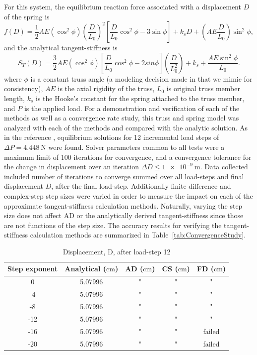 \documentclass[preprint,12pt]{elsarticle}
\begin{document}
%
For this system, the equilibrium reaction force associated with a displacement $D$ of the spring is 
%
\begin{equation} 
    \label{eqn:TrussForce}
    f(D) = \frac 1 2 AE(\cos^{2}\phi)\left(\frac{D}{L_{0}}\right)^{2}\left[\frac{D}{L_{0}}\cos^{2}\phi - 3\sin\phi\right] + k_{s}D + \left(AE\frac{D}{L_{0}}\right)\sin^{2}\phi,
\end{equation} 
%
and the analytical tangent-stiffness is 
%
\begin{equation} 
    \label{eqn:TrussStiffness}
    S_{T}(D) = \frac 3 2 AE(\cos^{2}\phi)\left[\frac{D}{L_{0}}\cos^{2}\phi - 2sin\phi\right]\left(\frac{D}{L_{0}^{2}}\right) + k_{s} + \frac{AE\sin^{2}\phi}{L_{0}}.
\end{equation}
%
where $\phi$ is a constant truss angle (a modeling decision made in \cite{rezaiee2010dynamic} that we mimic for consistency), $AE$ is the axial rigidity of the truss, $L_{0}$ is original truss member length, $k_{s}$ is the Hooke's constant for the spring attached to the truss member, and $P$ is the applied load. For a demonstration and verification of each of the methods as well as a convergence rate study, this truss and spring model was analyzed with each of the methods and compared with the analytic solution. As in the reference \cite{rezaiee2010dynamic}, equilibrium solutions for 12 incremental load steps of $\Delta P=\SI{4.448}{\newton}$ were found. Solver parameters common to all tests were a maximum limit of 100 iterations for convergence, and a convergence tolerance for the change in displacement over an iteration $\Delta D \le \SI{1e-9}{\meter}$.  Data collected included number of iterations to converge summed over all load-steps and final displacement $D$, after the final load-step. Additionally finite difference and complex-step step sizes were varied in order to measure the impact on each of the approximate tangent-stiffness calculation methods. Naturally, varying the step size does not affect AD or the analytically derived tangent-stiffness since those are not functions of the step size. The accuracy results for verifying the tangent-stiffness calculation methods are summarized in Table~\ref{tab:ConvergenceStudy}. 
%
\begin{table}[tbp]    
  \centering
  \caption{Displacement, D, after load-step 12} \label{tab:Verification}   
        \begin{tabular}{c c c c c}
         \toprule
         Step exponent & Analytical ($\si{\centi\meter}$) & AD ($\si{\centi\meter}$) & CS ($\si{\centi\meter}$) & FD ($\si{\centi\meter}$)\\ 
        \midrule
        0 & 5.07996 & " & " & "\\
        -4 & 5.07996 & " & " & "\\
        -8 & 5.07996 & " & " & "\\
        -12 & 5.07996 & " & " & " \\
        -16 & 5.07996 & " & " & failed \\
        -20 & 5.07996 & " & " & failed \\
        \bottomrule
    \end{tabular}
\end{table}
\end{document}
